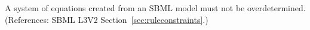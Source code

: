 A system of equations created from an SBML model must not be
overdetermined.  (References: SBML L3V2 Section~\ref{sec:ruleconstraints}.)
